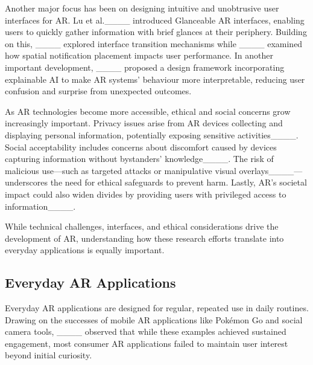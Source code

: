Another major focus has been on designing intuitive and unobtrusive user interfaces for AR. Lu et al.____ introduced Glanceable AR interfaces, enabling users to quickly gather information with brief glances at their periphery. Building on this, ____ explored interface transition mechanisms while ____ examined how spatial notification placement impacts user performance. In another important development, ____ proposed a design framework incorporating explainable AI to make AR systems’ behaviour more interpretable, reducing user confusion and surprise from unexpected outcomes.

As AR technologies become more accessible, ethical and social concerns grow increasingly important. Privacy issues arise from AR devices collecting and displaying personal information, potentially exposing sensitive activities____. Social acceptability includes concerns about discomfort caused by devices capturing information without bystanders’ knowledge____. The risk of malicious use—such as targeted attacks or manipulative visual overlays____—underscores the need for ethical safeguards to prevent harm. Lastly, AR’s societal impact could also widen divides by providing users with privileged access to information____.

While technical challenges, interfaces, and ethical considerations drive the development of AR, understanding how these research efforts translate into everyday applications is equally important.

\subsection{Everyday AR Applications}

Everyday AR applications are designed for regular, repeated use in daily routines. Drawing on the successes of mobile AR applications like Pokémon Go and social camera tools, ____ observed that while these examples achieved sustained engagement, most consumer AR applications failed to maintain user interest beyond initial curiosity.

